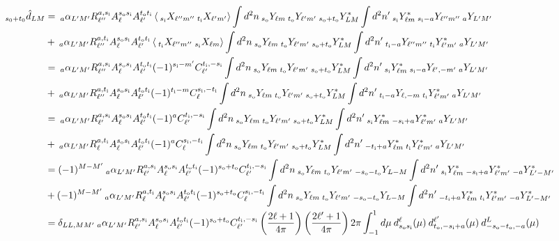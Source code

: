 \documentclass{article}
\newcommand{\si}[0]{{s_{\rm i}}}
\newcommand{\ti}[0]{{t_{\rm i}}}
\newcommand{\so}[0]{{s_{\rm o}}}
\renewcommand{\to}[0]{{t_{\rm o}}}
\newcommand{\av}[1]{\left\langle #1 \right\rangle}
\begin{document}
\begin{equation}
\begin{split}
	_{s_0 + t_0}\hat d_{LM}& =\:_a\alpha_{L'M'} R^{a, \si}_{\ell''}  A^{\so \si}_\ell  A^{\to \ti}_{\ell'} \av{\:_{\si}X_{\ell'' m''} \:_{\ti} X_{\ell' m'} }  \int d^2n \:_{\so}Y_{\ell m}\:_{\to}Y_{\ell' m'}\:_{\so + \to}Y^*_{LM} \int d^2n'   \:_{\si}Y^*_{\ell m}\:_{\si -a}Y_{\ell'' m''} \:_{a}Y_{L'M'}\\ 
	&+\:_a\alpha_{L'M'} R^{a, \ti}_{\ell''}  A^{\so \si}_\ell  A^{\to \ti}_{\ell'} \av{\:_{\ti}X_{\ell'' m''} \:_{\si} X_{\ell m} }  \int d^2n \:_{\so}Y_{\ell m}\:_{\to}Y_{\ell' m'}\:_{\so + \to}Y^*_{LM} \int d^2n' \:_{\ti -a}Y_{\ell'' m''} \:_{\ti}Y^*_{\ell' m'} \:_{a}Y_{L'M'}\\
	&= \:_a\alpha_{L'M'} R^{a, \si}_{\ell''}  A^{\so \si}_\ell  A^{\to \ti}_{\ell'} (-1)^{\si - m'}C_{\ell'}^{\ti, -\si}\int d^2n \:_{\so}Y_{\ell m}\:_{\to}Y_{\ell' m'}\:_{\so + \to}Y^*_{LM} \int d^2n'   \:_{\si}Y^*_{\ell m}\:_{\si -a}Y_{\ell', -m'} \:_{a}Y_{L'M'}\\
	&+\:_a\alpha_{L'M'} R^{a, \ti}_{\ell''}  A^{\so \si}_\ell  A^{\to \ti}_{\ell'} (-1)^{\ti-m}C_\ell^{\si,-\ti}  \int d^2n \:_{\so}Y_{\ell m}\:_{\to}Y_{\ell' m'}\:_{\so + \to}Y^*_{LM} \int d^2n' \:_{\ti -a}Y_{\ell, -m} \:_{\ti}Y^*_{\ell' m'} \:_{a}Y_{L'M'}\\
		&= \:_a\alpha_{L'M'} R^{a, \si}_{\ell'}  A^{\so \si}_\ell  A^{\to \ti}_{\ell'} (-1)^{a}C_{\ell'}^{\ti, -\si}\int d^2n \:_{\so}Y_{\ell m}\:_{\to}Y_{\ell' m'}\:_{\so + \to}Y^*_{LM} \int d^2n'   \:_{\si}Y^*_{\ell m}\:_{-\si +a}Y^*_{\ell'm'} \:_{a}Y_{L'M'}\\
	&+\:_a\alpha_{L'M'} R^{a, \ti}_{\ell}  A^{\so \si}_\ell  A^{\to \ti}_{\ell'} (-1)^{a}C_\ell^{\si,-\ti}  \int d^2n \:_{\so}Y_{\ell m}\:_{\to}Y_{\ell' m'}\:_{\so + \to}Y^*_{LM} \int d^2n' \:_{-\ti +a}Y^*_{\ell m} \:_{\ti}Y^*_{\ell' m'} \:_{a}Y_{L'M'}\\
	&= (-1)^{M-M'}\:_a\alpha_{L'M'} R^{a, \si}_{\ell'}  A^{\so \si}_\ell  A^{\to \ti}_{\ell'} (-1)^{\so+\to}C_{\ell'}^{\ti, -\si}\int d^2n \:_{\so}Y_{\ell m}\:_{\to}Y_{\ell' m'}\:_{-\so - \to}Y_{L-M} \int d^2n'   \:_{\si}Y^*_{\ell m}\:_{-\si +a}Y^*_{\ell'm'} \:_{-a}Y^*_{L'-M'}\\
	&+(-1)^{M-M'}\:_a\alpha_{L'M'} R^{a, \ti}_{\ell}  A^{\so \si}_\ell  A^{\to \ti}_{\ell'} (-1)^{\so + \to}C_\ell^{\si,-\ti}  \int d^2n \:_{\so}Y_{\ell m}\:_{\to}Y_{\ell' m'}\:_{-\so - \to}Y_{L-M} \int d^2n' \:_{-\ti +a}Y^*_{\ell m} \:_{\ti}Y^*_{\ell' m'} \:_{-a}Y^*_{L'-M'}\\
	&= \delta_{LL,MM'}\:_a\alpha_{L'M'} R^{a, \si}_{\ell'}  A^{\so \si}_\ell  A^{\to \ti}_{\ell'} (-1)^{\so+\to}C_{\ell'}^{\ti, -\si}  \left( \frac{2\ell + 1}{4\pi}\right) \left(\frac{2\ell' + 1}{4\pi} \right) 2\pi \int_{-1}^{1} d\mu \:d_{\so\si}^\ell (\mu)\: d_{\to,-\si + a}^{\ell'} (\mu)\:d_{-\so -\to,-a}^L(\mu) \\

\end{split}
\end{equation}
\end{document}
